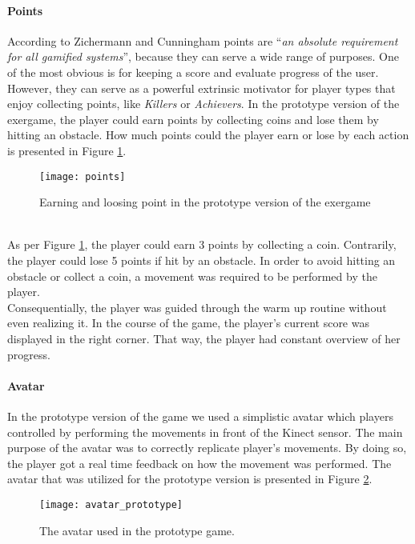 \paragraph{Points}
According to Zichermann and Cunningham \cite{zichermann2011gamification} points are ``\textit{an absolute requirement for all gamified systems}'', because they can serve a wide range of purposes. One of the most obvious is for keeping a score and evaluate progress of the user. However, they can serve as a powerful extrinsic motivator for player types that enjoy collecting points, like \textit{Killers} or \textit{Achievers}. In the prototype version of the exergame, the player could earn points by collecting coins and lose them by hitting an obstacle. How much points could the player earn or lose by each action is presented in Figure \ref{fig:points}.\\
\begin{figure}[h]
    \centering
    \texttt{[image: points]}
    \caption{Earning and loosing point in the prototype version of the exergame}
    \label{fig:points}
\end{figure}\\
As per Figure \ref{fig:points}, the player could earn 3 points by collecting a coin. Contrarily, the player could lose 5 points if hit by an obstacle. In order to avoid hitting an obstacle or collect a coin, a movement was required to be performed by the player.\\ Consequentially, the player was guided through the warm up routine without even realizing it. In the course of the game, the player's current score was displayed in the right corner. That way, the player had constant overview of her progress.  
\paragraph{Avatar}
In the prototype version of the game we used a simplistic avatar which players controlled by performing the movements in front of the Kinect sensor. The main purpose of the avatar was to correctly replicate player's movements. By doing so, the player got a real time feedback on how the movement was performed. The avatar that was utilized for the prototype version is presented in Figure \ref{fig:avatar_prototype}.\\
\begin{figure}[h]
    \centering
    \texttt{[image: avatar\_prototype]}
    \caption{The avatar used in the prototype game.}
    \label{fig:avatar_prototype}
\end{figure}
